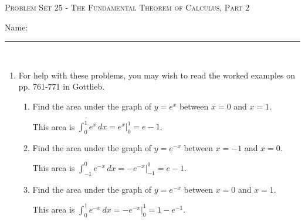 \documentclass{article}
\begin{document}
\begin{center}
  \large\textsc{Problem Set 25 - The Fundamental Theorem of Calculus, Part 2}
  
      \pspace{12pt}
  \begin{problemonly}\large Name: \rule{5cm}{0.15mm}\\ \end{problemonly}
\end{center}

\begin{enumerate}
\item For help with these problems, you may wish to read the worked examples on pp. 761-771 in Gottlieb.

  \begin{enumerate}
  \item \label{gottlieb-24.1.5}

    \begin{problem}
      Find the area under the graph of $y=e^x$ between $x=0$ and $x=1$.
    \end{problem}

    \pspace{\vfill}

    \begin{solution} %
      This area is $\displaystyle \int_0^1 e^x \, dx = e^x \Big|_0^1 =
      \boxed{e - 1}$.
    \end{solution}

  \item \label{gottlieb-24.1.6a}

    \begin{problem}
      Find the area under the graph of $y=e^{-x}$ between $x=-1$ and
      $x=0$.
    \end{problem}

    \pspace{\vfill}

    \begin{solution} %
      This area is $\displaystyle \int_{-1}^0 e^{-x} \, dx = -e^{-x}
      \Big|_{-1}^0 = \boxed{e - 1}$.
    \end{solution}

  \item \label{gottlieb-24.1.6b}

    \begin{problem}
      Find the area under the graph of $y=e^{-x}$ between $x=0$ and $x=1$.
    \end{problem}

    \pspace{\vfill}

    \begin{solution} %
      This area is $\displaystyle \int_0^1 e^{-x} \, dx = -e^{-x}
      \Big|_0^1 = \boxed{1 - e^{-1}}$.
    \end{solution}


\end{enumerate}
\end{enumerate}
\end{document}
